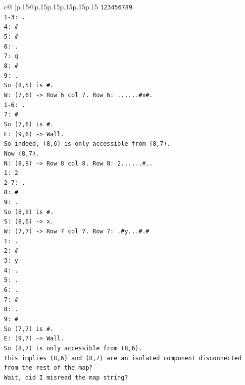 \documentclass{article}
\begin{document}
{\begin{supertabular}{c@{$\;$}|p{.15\linewidth}@{}p{.15\linewidth}p{.15\linewidth}p{.15\linewidth}p{.15\linewidth}p{.15\linewidth}}
{{{\texttt{123456789} \\
\texttt{1{-}3: .} \\
\texttt{4: \#} \\
\texttt{5: \#} \\
\texttt{6: .} \\
\texttt{7: q} \\
\texttt{8: \#} \\
\texttt{9: .} \\
\texttt{So (8,5) is \#.} \\
\texttt{W: (7,6) {-}> Row 6 col 7. Row 6: ......\#x\#.} \\
\texttt{1{-}6: .} \\
\texttt{7: \#} \\
\texttt{So (7,6) is \#.} \\
\texttt{E: (9,6) {-}> Wall.} \\
\texttt{So indeed, (8,6) is only accessible from (8,7).} \\
\texttt{Now (8,7).} \\
\texttt{N: (8,8) {-}> Row 8 col 8. Row 8: 2......\#..} \\
\texttt{1: 2} \\
\texttt{2{-}7: .} \\
\texttt{8: \#} \\
\texttt{9: .} \\
\texttt{So (8,8) is \#.} \\
\texttt{S: (8,6) {-}> x.} \\
\texttt{W: (7,7) {-}> Row 7 col 7. Row 7: .\#y...\#.\#} \\
\texttt{1: .} \\
\texttt{2: \#} \\
\texttt{3: y} \\
\texttt{4: .} \\
\texttt{5: .} \\
\texttt{6: .} \\
\texttt{7: \#} \\
\texttt{8: .} \\
\texttt{9: \#} \\
\texttt{So (7,7) is \#.} \\
\texttt{E: (9,7) {-}> Wall.} \\
\texttt{So (8,7) is only accessible from (8,6).} \\
\texttt{This implies (8,6) and (8,7) are an isolated component disconnected from the rest of the map?} \\
\texttt{Wait, did I misread the map string?} \\
}}}
\end{supertabular}}
\end{document}
